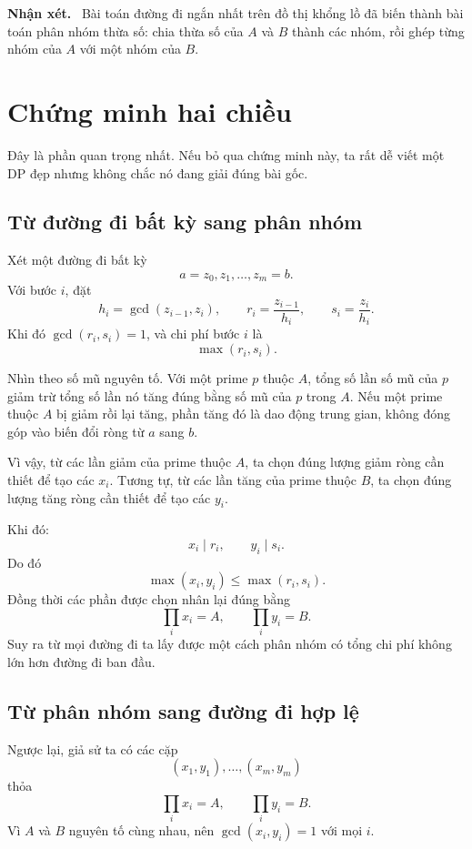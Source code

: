 \documentclass[11pt,a4paper]{article}
\newenvironment{insight}
{\par\medskip\noindent\begin{minipage}{0.96\linewidth}\color{deepblue}\textbf{Nhận xét.}\ }
{\end{minipage}\par\medskip}
\begin{document}
\begin{insight}
Bài toán đường đi ngắn nhất trên đồ thị khổng lồ đã biến thành bài toán phân nhóm thừa số: chia thừa số của \(A\) và \(B\) thành các nhóm, rồi ghép từng nhóm của \(A\) với một nhóm của \(B\).
\end{insight}

\section{Chứng minh hai chiều}

Đây là phần quan trọng nhất. Nếu bỏ qua chứng minh này, ta rất dễ viết một DP đẹp nhưng không chắc nó đang giải đúng bài gốc.

\subsection{Từ đường đi bất kỳ sang phân nhóm}

Xét một đường đi bất kỳ
\[
  a=z_0,z_1,\ldots,z_m=b.
\]
Với bước \(i\), đặt
\[
  h_i=\gcd(z_{i-1},z_i),\qquad
  r_i=\frac{z_{i-1}}{h_i},\qquad
  s_i=\frac{z_i}{h_i}.
\]
Khi đó \(\gcd(r_i,s_i)=1\), và chi phí bước \(i\) là
\[
  \max(r_i,s_i).
\]

Nhìn theo số mũ nguyên tố. Với một prime \(p\) thuộc \(A\), tổng số lần số mũ của \(p\) giảm trừ tổng số lần nó tăng đúng bằng số mũ của \(p\) trong \(A\). Nếu một prime thuộc \(A\) bị giảm rồi lại tăng, phần tăng đó là dao động trung gian, không đóng góp vào biến đổi ròng từ \(a\) sang \(b\).

Vì vậy, từ các lần giảm của prime thuộc \(A\), ta chọn đúng lượng giảm ròng cần thiết để tạo các \(x_i\). Tương tự, từ các lần tăng của prime thuộc \(B\), ta chọn đúng lượng tăng ròng cần thiết để tạo các \(y_i\).

Khi đó:
\[
  x_i\mid r_i,\qquad y_i\mid s_i.
\]
Do đó
\[
  \max(x_i,y_i)\le \max(r_i,s_i).
\]
Đồng thời các phần được chọn nhân lại đúng bằng
\[
  \prod_i x_i=A,\qquad \prod_i y_i=B.
\]
Suy ra từ mọi đường đi ta lấy được một cách phân nhóm có tổng chi phí không lớn hơn đường đi ban đầu.

\subsection{Từ phân nhóm sang đường đi hợp lệ}

Ngược lại, giả sử ta có các cặp
\[
  (x_1,y_1),\ldots,(x_m,y_m)
\]
thỏa
\[
  \prod_i x_i=A,\qquad \prod_i y_i=B.
\]
Vì \(A\) và \(B\) nguyên tố cùng nhau, nên \(\gcd(x_i,y_i)=1\) với mọi \(i\).
\end{document}
